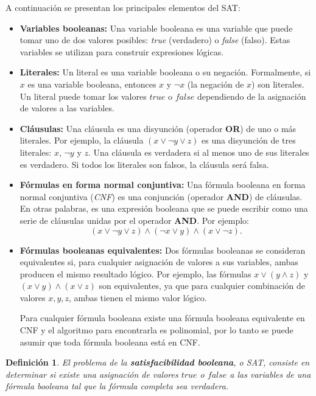 \documentclass[12pt]{article}
\newtheorem{definition}{Definición}
\begin{document}
A continuación se presentan los principales elementos del SAT:

\begin{itemize}
  \item \textbf{Variables booleanas:}
        Una variable booleana es una variable que puede tomar uno de dos valores posibles: \textit{true} (verdadero) o \textit{false} (falso). Estas variables se utilizan para construir expresiones lógicas.
  \item \textbf{Literales:}
        Un literal es una variable booleana o su negación. Formalmente, si \( x \) es una variable booleana, entonces \( x \) y \( \neg x \) (la negación de \( x \)) son literales. Un literal puede tomar los valores \( true \) o \( false \) dependiendo de la asignación de valores a las variables.
  \item  \textbf{Cláusulas:}
        Una cláusula es una disyunción (operador \textbf{OR}) de uno o más literales. Por ejemplo, la cláusula \( (x \vee \neg y \vee z) \) es una disyunción de tres literales: \( x \), \( \neg y \) y \( z \). Una cláusula es verdadera si al menos uno de sus literales es verdadero. Si todos los literales son falsos, la cláusula será falsa.
  \item \textbf{Fórmulas en forma normal conjuntiva:}
        Una fórmula booleana en forma normal conjuntiva (\textit{CNF}) es una conjunción (operador \textbf{AND}) de cláusulas. En otras palabras, es una expresión booleana que se puede escribir como una serie de cláusulas unidas por el operador \textbf{AND}. Por ejemplo:        
        \[
          (x \vee \neg y \vee z) \wedge (\neg x \vee y) \wedge (x \vee \neg z).
        \]
  \item \textbf{Fórmulas booleanas equivalentes:}
        Dos fórmulas booleanas se consideran equivalentes si, para cualquier asignación de valores a sus variables, ambas producen el mismo resultado lógico. Por ejemplo, las fórmulas \( x \vee (y \wedge z) \) y \( (x \vee y) \wedge (x \vee z) \) son equivalentes, ya que para cualquier combinación de valores \( x, y, z \), ambas tienen el mismo valor lógico.
        
        Para cualquier fórmula booleana existe una fórmula booleana equivalente en CNF \cite{authomataTheory} y 
        el algoritmo para encontrarla es polinomial, por lo tanto se puede asumir que toda fórmula booleana está en CNF.
        
\end{itemize}

\begin{definition}  
  El problema de la \textbf{satisfacibilidad booleana}, o SAT, consiste en determinar si existe una asignación de valores \( true \) o \( false \) a las variables de una fórmula booleana tal que la fórmula completa sea verdadera. 
\end{definition}
\end{document}
